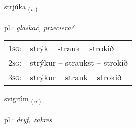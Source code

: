 \documentclass[frontgrid, backgrid]{flacards}\usepackage[]{graphicx}\usepackage[]{xcolor}
\begin{document}
\renewcommand{\flhead}{\vskip5pt \fboxsep=0pt {\small\bfseries\footnotesize Sagnorð | czasownik}}
\renewcommand{\fcfoot}{\vskip5pt \fboxsep=0pt \hspace{2pt}{\small\bfseries\footnotesize 3K}}

\renewcommand{\blhead}{\vskip5pt {\small\bfseries\footnotesize Sagnorð | czasownik }}
\renewcommand{\bcfoot}{\vskip5pt \hspace{2pt}{\small\bfseries\footnotesize 3K}}


{strjúka \small{\textsubscript{(\textit{v.})}} \\[1ex] %
\textphonetic{[strjuːka]} \\
pl.: \emph{głaskać, przecierać} \\  [2ex]
\renewcommand*{\arraystretch}{0.8}
\begin{tabular}{p{1cm}l}
\textsc{1sg}: & strýk -- strauk -- strokið \\ 
\textsc{2sg}: & strýkur -- straukst -- strokið \\ 
\textsc{3sg}: & strýkur -- strauk -- strokið \\ 
\end{tabular}
}

\renewcommand{\flhead}{\vskip5pt \fboxsep=0pt {\small\bfseries\footnotesize Nafnorð | rzeczownik}}
\renewcommand{\fcfoot}{\vskip5pt \fboxsep=0pt \hspace{2pt}{\small\bfseries\footnotesize 3K}}

\renewcommand{\blhead}{\vskip5pt {\small\bfseries\footnotesize Nafnorð | rzeczownik }}
\renewcommand{\bcfoot}{\vskip5pt \hspace{2pt}{\small\bfseries\footnotesize 3K}}


{svigrúm \small{\textsubscript{(\textit{n.})}} \\[1ex] %
\textphonetic{[svɪɣrum]} \\
pl.: \emph{dryf, zakres} \\  [2ex]
\renewcommand*{\arraystretch}{0.8}
}
\end{document}
